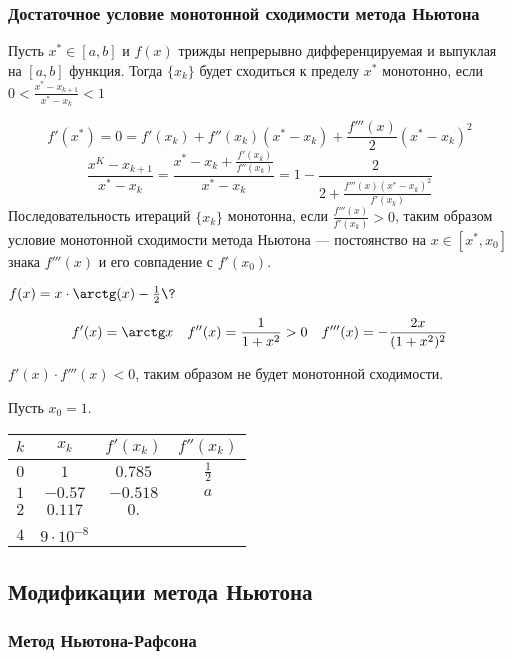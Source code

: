 \subsubsection{Достаточное условие монотонной сходимости метода Ньютона}

Пусть \(x^* \in [a, b]\) и \(f(x)\) трижды непрерывно дифференцируемая и выпуклая на \([a, b]\) функция. Тогда \(\{x_k\}\) будет сходиться к пределу \(x^*\) монотонно, если \(0 < \frac{x^* - x_{k+1}}{x^* - x_k} < 1\)

\[f'(x^*) = 0 = f'(x_k) + f''(x_k)(x^* - x_k) + \frac{f'''(x)}{2} (x^* - x_k)^2\]
\[\frac{x^K - x_{k+1}}{x^* - x_k} = \frac{x^* - x_k + \frac{f'(x_k)}{f''(x_k)}}{x^* - x_k} = 1 - \frac{2}{2 + \frac{f'''(x) (x^* - x_k)^2}{f'(x_k)}}\]
Последовательность итераций \(\{x_k\}\) монотонна, если \(\frac{f'''(x)}{f'(x_k)} > 0\), таким образом условие монотонной сходимости метода Ньютона --- постоянство на \(x\in [x^*, x_0]\) знака \(f'''(x)\) и его совпадение с \(f'(x_0)\).

\begin{example}
    \(f(x) = x \cdot \arctg (x) - \frac{1}{2} \?\)

    \[f'(x) = \arctg x \quad f''(x) = \frac{1}{1 + x^2} > 0 \quad f'''(x) = - \frac{2x}{(1 + x^2)^2}\]

    \(f'(x) \cdot f'''(x) < 0\), таким образом не будет монотонной сходимости.

    Пусть \(x_0 = 1\).

    \begin{tabular}{c|c|c|c}
        \(k\) & \(x_k\)              & \(f'(x_k)\)  & \(f''(x_k)\)    \\ \hline
        \(0\) & \(1\)                & \(0.785\)    & \(\frac{1}{2}\) \\
        \(1\) & \( - 0.57\)          & \( - 0.518\) & \(a\)           \\
        \(2\) & \(0.117\)            & \( 0.\)      &                 \\
              &                      &              &                 \\
        \(4\) & \(9\cdot 10^{ - 8}\) &
    \end{tabular}
\end{example}

\subsection{Модификации метода Ньютона}

\subsubsection{Метод Ньютона-Рафсона}

